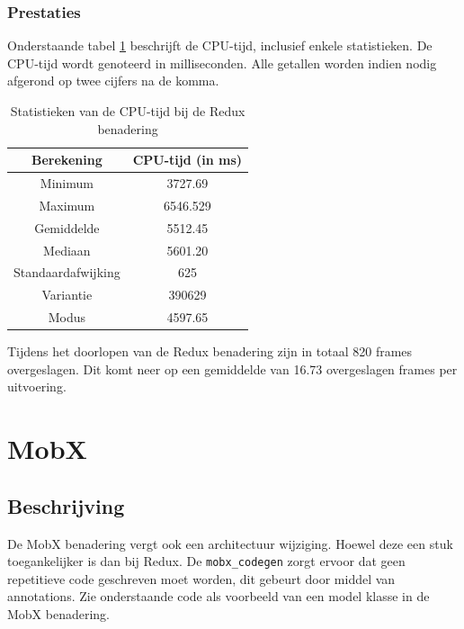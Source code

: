 \subsubsection{Prestaties}
Onderstaande tabel \ref{table:experiment-redux-statistics} beschrijft de CPU-tijd, inclusief enkele statistieken. De CPU-tijd wordt genoteerd in milliseconden. Alle getallen worden indien nodig afgerond op twee cijfers na de komma.
\begin{table}[H]
    \centering
    \begin{tabular}{c|c}
        \textbf{Berekening} & \textbf{CPU-tijd (in ms)} \\ \hline
        Minimum             & 3727.69                   \\ \hline
        Maximum             & 6546.529                  \\ \hline
        Gemiddelde          & 5512.45                   \\ \hline
        Mediaan             & 5601.20                   \\ \hline
        Standaardafwijking  & 625                       \\ \hline
        Variantie           & 390629                    \\ \hline
        Modus               & 4597.65                      \\                
    \end{tabular}
    \caption{Statistieken van de CPU-tijd bij de Redux benadering}
    \label{table:experiment-redux-statistics}
\end{table}

Tijdens het doorlopen van de Redux benadering zijn in totaal 820 frames overgeslagen. Dit komt neer op een gemiddelde van 16.73 overgeslagen frames per uitvoering.

\section{MobX}
\subsection{Beschrijving}
De MobX benadering vergt ook een architectuur wijziging. Hoewel deze een stuk toegankelijker is dan bij Redux. De \verb|mobx_codegen| zorgt ervoor dat geen repetitieve code geschreven moet worden, dit gebeurt door middel van annotations. Zie onderstaande code als voorbeeld van een model klasse in de MobX benadering.

